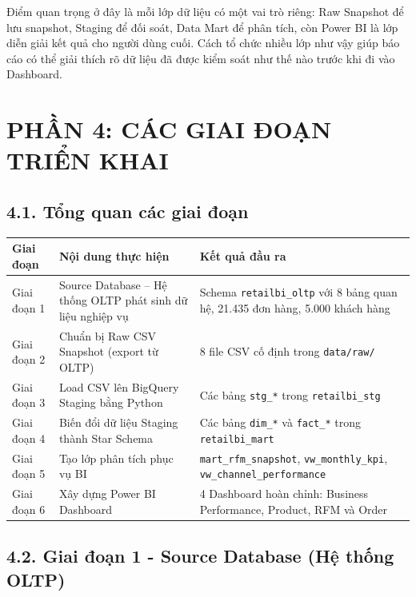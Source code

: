 \documentclass[12pt,a4paper]{article}
\newcommand{\code}[1]{\texttt{#1}}
\begin{document}
Điểm quan trọng ở đây là mỗi lớp dữ liệu có một vai trò riêng: Raw Snapshot để lưu snapshot, Staging để đối soát, Data Mart để phân tích, còn Power BI là lớp diễn giải kết quả cho người dùng cuối. Cách tổ chức nhiều lớp như vậy giúp báo cáo có thể giải thích rõ dữ liệu đã được kiểm soát như thế nào trước khi đi vào Dashboard.

\section{PHẦN 4: CÁC GIAI ĐOẠN TRIỂN KHAI}

\subsection{4.1. Tổng quan các giai đoạn}

\begin{table}[H]
\centering
{\small
\begin{tabularx}{\textwidth}{|p{}|p{}|Y|}
\hline
\textbf{Giai đoạn} & \textbf{Nội dung thực hiện} & \textbf{Kết quả đầu ra} \\
\hline
Giai đoạn 1 & Source Database -- Hệ thống OLTP phát sinh dữ liệu nghiệp vụ & Schema \code{retailbi\_oltp} với 8 bảng quan hệ, 21.435 đơn hàng, 5.000 khách hàng \\
\hline
Giai đoạn 2 & Chuẩn bị Raw CSV Snapshot (export từ OLTP) & 8 file CSV cố định trong \code{data/raw/} \\
\hline
Giai đoạn 3 & Load CSV lên BigQuery Staging bằng Python & Các bảng \code{stg\_*} trong \code{retailbi\_stg} \\
\hline
Giai đoạn 4 & Biến đổi dữ liệu Staging thành Star Schema & Các bảng \code{dim\_*} và \code{fact\_*} trong \code{retailbi\_mart} \\
\hline
Giai đoạn 5 & Tạo lớp phân tích phục vụ BI & \code{mart\_rfm\_snapshot}, \code{vw\_monthly\_kpi}, \code{vw\_channel\_performance} \\
\hline
Giai đoạn 6 & Xây dựng Power BI Dashboard & 4 Dashboard hoàn chỉnh: Business Performance, Product, RFM và Order \\
\hline
\end{tabularx}
}
\end{table}

\subsection{4.2. Giai đoạn 1 - Source Database (Hệ thống OLTP)}
\end{document}

